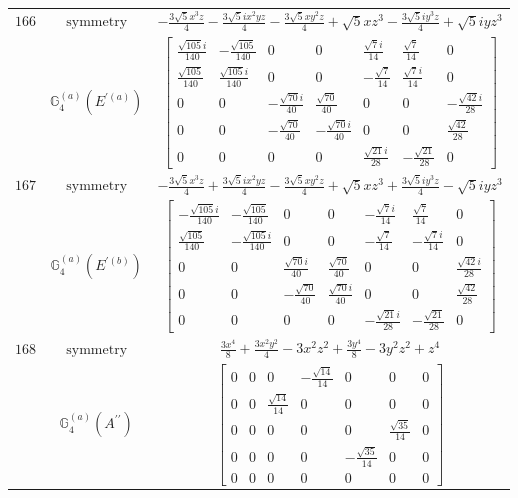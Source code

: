 \documentclass[fleqn,8pt,landscape]{jsarticle}
\begin{document}
\begin{longtable}{ccc}
$ 166 $ & $ \text{symmetry} $ & $ - \frac{3 \sqrt{5} x^{3} z}{4} - \frac{3 \sqrt{5} i x^{2} y z}{4} - \frac{3 \sqrt{5} x y^{2} z}{4} + \sqrt{5} x z^{3} - \frac{3 \sqrt{5} i y^{3} z}{4} + \sqrt{5} i y z^{3} $ \\
$  $ & $ \mathbb{G}_{4}^{(a)}(E^{\prime(a)}) $ & $ \begin{bmatrix} \frac{\sqrt{105} i}{140} & - \frac{\sqrt{105}}{140} & 0 & 0 & \frac{\sqrt{7} i}{14} & \frac{\sqrt{7}}{14} & 0 \\ \frac{\sqrt{105}}{140} & \frac{\sqrt{105} i}{140} & 0 & 0 & - \frac{\sqrt{7}}{14} & \frac{\sqrt{7} i}{14} & 0 \\ 0 & 0 & - \frac{\sqrt{70} i}{40} & \frac{\sqrt{70}}{40} & 0 & 0 & - \frac{\sqrt{42} i}{28} \\ 0 & 0 & - \frac{\sqrt{70}}{40} & - \frac{\sqrt{70} i}{40} & 0 & 0 & \frac{\sqrt{42}}{28} \\ 0 & 0 & 0 & 0 & \frac{\sqrt{21} i}{28} & - \frac{\sqrt{21}}{28} & 0 \end{bmatrix} $ \\ \hline
$ 167 $ & $ \text{symmetry} $ & $ - \frac{3 \sqrt{5} x^{3} z}{4} + \frac{3 \sqrt{5} i x^{2} y z}{4} - \frac{3 \sqrt{5} x y^{2} z}{4} + \sqrt{5} x z^{3} + \frac{3 \sqrt{5} i y^{3} z}{4} - \sqrt{5} i y z^{3} $ \\
$  $ & $ \mathbb{G}_{4}^{(a)}(E^{\prime(b)}) $ & $ \begin{bmatrix} - \frac{\sqrt{105} i}{140} & - \frac{\sqrt{105}}{140} & 0 & 0 & - \frac{\sqrt{7} i}{14} & \frac{\sqrt{7}}{14} & 0 \\ \frac{\sqrt{105}}{140} & - \frac{\sqrt{105} i}{140} & 0 & 0 & - \frac{\sqrt{7}}{14} & - \frac{\sqrt{7} i}{14} & 0 \\ 0 & 0 & \frac{\sqrt{70} i}{40} & \frac{\sqrt{70}}{40} & 0 & 0 & \frac{\sqrt{42} i}{28} \\ 0 & 0 & - \frac{\sqrt{70}}{40} & \frac{\sqrt{70} i}{40} & 0 & 0 & \frac{\sqrt{42}}{28} \\ 0 & 0 & 0 & 0 & - \frac{\sqrt{21} i}{28} & - \frac{\sqrt{21}}{28} & 0 \end{bmatrix} $ \\ \hline
$ 168 $ & $ \text{symmetry} $ & $ \frac{3 x^{4}}{8} + \frac{3 x^{2} y^{2}}{4} - 3 x^{2} z^{2} + \frac{3 y^{4}}{8} - 3 y^{2} z^{2} + z^{4} $ \\
$  $ & $ \mathbb{G}_{4}^{(a)}(A^{\prime\prime}) $ & $ \begin{bmatrix} 0 & 0 & 0 & - \frac{\sqrt{14}}{14} & 0 & 0 & 0 \\ 0 & 0 & \frac{\sqrt{14}}{14} & 0 & 0 & 0 & 0 \\ 0 & 0 & 0 & 0 & 0 & \frac{\sqrt{35}}{14} & 0 \\ 0 & 0 & 0 & 0 & - \frac{\sqrt{35}}{14} & 0 & 0 \\ 0 & 0 & 0 & 0 & 0 & 0 & 0 \end{bmatrix} $ \\ \hline

\end{longtable}
\end{document}
